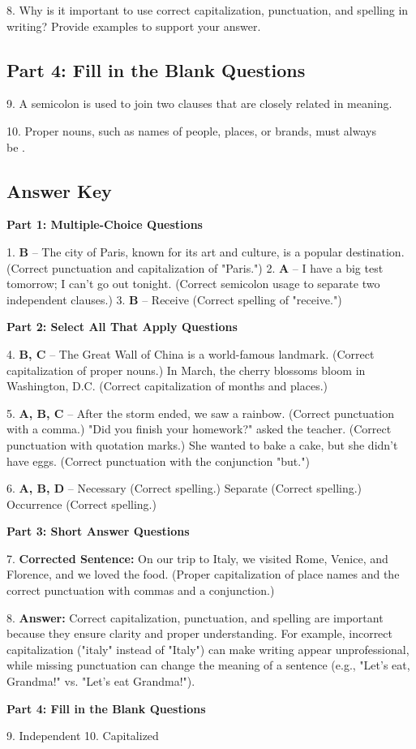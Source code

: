 \documentclass[12pt]{article}
\begin{document}
8. Why is it important to use correct capitalization, punctuation, and spelling in writing? Provide examples to support your answer.  
\vspace{4cm}

\subsection*{Part 4: Fill in the Blank Questions}

9. A semicolon is used to join two \underline{\hspace{4cm}} clauses that are closely related in meaning.  
\vspace{2cm}

10. Proper nouns, such as names of people, places, or brands, must always \\be \underline{\hspace{4cm}}.  
\vspace{2cm}
\newpage
\subsection*{Answer Key}

\textbf{Part 1: Multiple-Choice Questions}

1. \textbf{B} – The city of Paris, known for its art and culture, is a popular destination. (Correct punctuation and capitalization of "Paris.")
2. \textbf{A} – I have a big test tomorrow; I can't go out tonight. (Correct semicolon usage to separate two independent clauses.)
3. \textbf{B} – Receive (Correct spelling of "receive.")

\textbf{Part 2: Select All That Apply Questions}

4. \textbf{B, C} – The Great Wall of China is a world-famous landmark. (Correct capitalization of proper nouns.)  
In March, the cherry blossoms bloom in Washington, D.C. (Correct capitalization of months and places.)

5. \textbf{A, B, C} – After the storm ended, we saw a rainbow. (Correct punctuation with a comma.)  
"Did you finish your homework?" asked the teacher. (Correct punctuation with quotation marks.)  
She wanted to bake a cake, but she didn't have eggs. (Correct punctuation with the conjunction "but.")

6. \textbf{A, B, D} – Necessary (Correct spelling.)  
Separate (Correct spelling.)  
Occurrence (Correct spelling.)

\textbf{Part 3: Short Answer Questions}

7. \textbf{Corrected Sentence:} On our trip to Italy, we visited Rome, Venice, and Florence, and we loved the food.  
(Proper capitalization of place names and the correct punctuation with commas and a conjunction.)

8. \textbf{Answer:} Correct capitalization, punctuation, and spelling are important because they ensure clarity and proper understanding. For example, incorrect capitalization ("italy" instead of "Italy") can make writing appear unprofessional, while missing punctuation can change the meaning of a sentence (e.g., "Let's eat, Grandma!" vs. "Let's eat Grandma!").

\textbf{Part 4: Fill in the Blank Questions}

9. Independent  
10. Capitalized  
\end{document}
